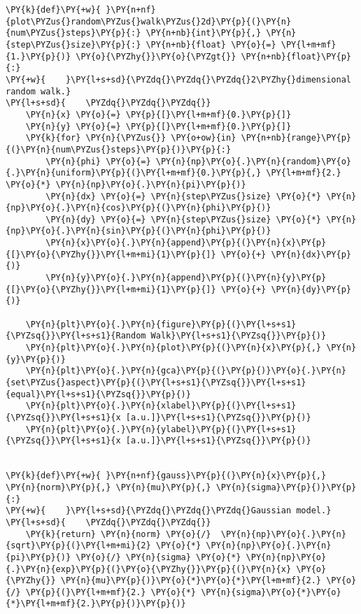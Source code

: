 \begin{Verbatim}[label=\makebox{\href{https://github.com/unipi-physics-labs/lab1-sheets/tree/main/snippy/random_walk.py}{https://github.com/.../random\_walk.py}},commandchars=\\\{\}]
\PY{k}{def}\PY{+w}{ }\PY{n+nf}{plot\PYZus{}random\PYZus{}walk\PYZus{}2d}\PY{p}{(}\PY{n}{num\PYZus{}steps}\PY{p}{:} \PY{n+nb}{int}\PY{p}{,} \PY{n}{step\PYZus{}size}\PY{p}{:} \PY{n+nb}{float} \PY{o}{=} \PY{l+m+mf}{1.}\PY{p}{)} \PY{o}{\PYZhy{}}\PY{o}{\PYZgt{}} \PY{n+nb}{float}\PY{p}{:}
\PY{+w}{    }\PY{l+s+sd}{\PYZdq{}\PYZdq{}\PYZdq{}2\PYZhy{}dimensional random walk.}
\PY{l+s+sd}{    \PYZdq{}\PYZdq{}\PYZdq{}}
    \PY{n}{x} \PY{o}{=} \PY{p}{[}\PY{l+m+mf}{0.}\PY{p}{]}
    \PY{n}{y} \PY{o}{=} \PY{p}{[}\PY{l+m+mf}{0.}\PY{p}{]}
    \PY{k}{for} \PY{n}{\PYZus{}} \PY{o+ow}{in} \PY{n+nb}{range}\PY{p}{(}\PY{n}{num\PYZus{}steps}\PY{p}{)}\PY{p}{:}
        \PY{n}{phi} \PY{o}{=} \PY{n}{np}\PY{o}{.}\PY{n}{random}\PY{o}{.}\PY{n}{uniform}\PY{p}{(}\PY{l+m+mf}{0.}\PY{p}{,} \PY{l+m+mf}{2.} \PY{o}{*} \PY{n}{np}\PY{o}{.}\PY{n}{pi}\PY{p}{)}
        \PY{n}{dx} \PY{o}{=} \PY{n}{step\PYZus{}size} \PY{o}{*} \PY{n}{np}\PY{o}{.}\PY{n}{cos}\PY{p}{(}\PY{n}{phi}\PY{p}{)}
        \PY{n}{dy} \PY{o}{=} \PY{n}{step\PYZus{}size} \PY{o}{*} \PY{n}{np}\PY{o}{.}\PY{n}{sin}\PY{p}{(}\PY{n}{phi}\PY{p}{)}
        \PY{n}{x}\PY{o}{.}\PY{n}{append}\PY{p}{(}\PY{n}{x}\PY{p}{[}\PY{o}{\PYZhy{}}\PY{l+m+mi}{1}\PY{p}{]} \PY{o}{+} \PY{n}{dx}\PY{p}{)}
        \PY{n}{y}\PY{o}{.}\PY{n}{append}\PY{p}{(}\PY{n}{y}\PY{p}{[}\PY{o}{\PYZhy{}}\PY{l+m+mi}{1}\PY{p}{]} \PY{o}{+} \PY{n}{dy}\PY{p}{)}

    \PY{n}{plt}\PY{o}{.}\PY{n}{figure}\PY{p}{(}\PY{l+s+s1}{\PYZsq{}}\PY{l+s+s1}{Random Walk}\PY{l+s+s1}{\PYZsq{}}\PY{p}{)}
    \PY{n}{plt}\PY{o}{.}\PY{n}{plot}\PY{p}{(}\PY{n}{x}\PY{p}{,} \PY{n}{y}\PY{p}{)}
    \PY{n}{plt}\PY{o}{.}\PY{n}{gca}\PY{p}{(}\PY{p}{)}\PY{o}{.}\PY{n}{set\PYZus{}aspect}\PY{p}{(}\PY{l+s+s1}{\PYZsq{}}\PY{l+s+s1}{equal}\PY{l+s+s1}{\PYZsq{}}\PY{p}{)}
    \PY{n}{plt}\PY{o}{.}\PY{n}{xlabel}\PY{p}{(}\PY{l+s+s1}{\PYZsq{}}\PY{l+s+s1}{x [a.u.]}\PY{l+s+s1}{\PYZsq{}}\PY{p}{)}
    \PY{n}{plt}\PY{o}{.}\PY{n}{ylabel}\PY{p}{(}\PY{l+s+s1}{\PYZsq{}}\PY{l+s+s1}{x [a.u.]}\PY{l+s+s1}{\PYZsq{}}\PY{p}{)}


\PY{k}{def}\PY{+w}{ }\PY{n+nf}{gauss}\PY{p}{(}\PY{n}{x}\PY{p}{,} \PY{n}{norm}\PY{p}{,} \PY{n}{mu}\PY{p}{,} \PY{n}{sigma}\PY{p}{)}\PY{p}{:}
\PY{+w}{    }\PY{l+s+sd}{\PYZdq{}\PYZdq{}\PYZdq{}Gaussian model.}
\PY{l+s+sd}{    \PYZdq{}\PYZdq{}\PYZdq{}}
    \PY{k}{return} \PY{n}{norm} \PY{o}{/}  \PY{n}{np}\PY{o}{.}\PY{n}{sqrt}\PY{p}{(}\PY{l+m+mi}{2} \PY{o}{*} \PY{n}{np}\PY{o}{.}\PY{n}{pi}\PY{p}{)} \PY{o}{/} \PY{n}{sigma} \PY{o}{*} \PY{n}{np}\PY{o}{.}\PY{n}{exp}\PY{p}{(}\PY{o}{\PYZhy{}}\PY{p}{(}\PY{n}{x} \PY{o}{\PYZhy{}} \PY{n}{mu}\PY{p}{)}\PY{o}{*}\PY{o}{*}\PY{l+m+mf}{2.} \PY{o}{/} \PY{p}{(}\PY{l+m+mf}{2.} \PY{o}{*} \PY{n}{sigma}\PY{o}{*}\PY{o}{*}\PY{l+m+mf}{2.}\PY{p}{)}\PY{p}{)}



\end{Verbatim}
